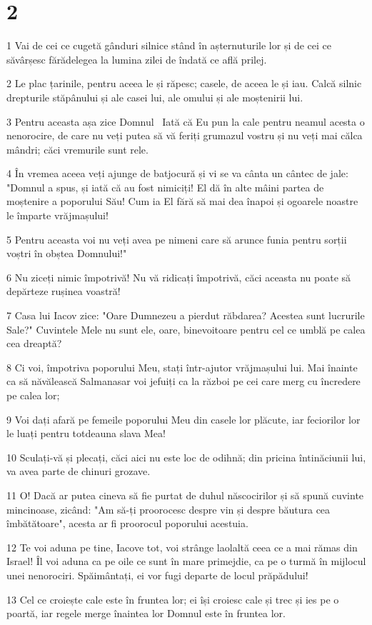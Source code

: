\chapter{2}

\par 1 Vai de cei ce cugetă gânduri silnice stând în așternuturile lor și de cei ce săvârșesc fărădelegea la lumina zilei de îndată ce află prilej.
\par 2 Le plac țarinile, pentru aceea le și răpesc; casele, de aceea le și iau. Calcă silnic drepturile stăpânului și ale casei lui, ale omului și ale moștenirii lui.
\par 3 Pentru aceasta așa zice Domnul  Iată că Eu pun la cale pentru neamul acesta o nenorocire, de care nu veți putea să vă feriți grumazul vostru și nu veți mai călca mândri; căci vremurile sunt rele.
\par 4 În vremea aceea veți ajunge de batjocură și vi se va cânta un cântec de jale: "Domnul a spus, și iată că au fost nimiciți! El dă în alte mâini partea de moștenire a poporului Său! Cum ia El fără să mai dea înapoi și ogoarele noastre le împarte vrăjmașului!
\par 5 Pentru aceasta voi nu veți avea pe nimeni care să arunce funia pentru sorții voștri în obștea Domnului!"
\par 6 Nu ziceți nimic împotrivă! Nu vă ridicați împotrivă, căci aceasta nu poate să depărteze rușinea voastră!
\par 7 Casa lui Iacov zice: "Oare Dumnezeu a pierdut răbdarea? Acestea sunt lucrurile Sale?" Cuvintele Mele nu sunt ele, oare, binevoitoare pentru cel ce umblă pe calea cea dreaptă?
\par 8 Ci voi, împotriva poporului Meu, stați într-ajutor vrăjmașului lui. Mai înainte ca să năvălească Salmanasar voi jefuiți ca la război pe cei care merg cu încredere pe calea lor;
\par 9 Voi dați afară pe femeile poporului Meu din casele lor plăcute, iar feciorilor lor le luați pentru totdeauna slava Mea!
\par 10 Sculați-vă și plecați, căci aici nu este loc de odihnă; din pricina întinăciunii lui, va avea parte de chinuri grozave.
\par 11 O! Dacă ar putea cineva să fie purtat de duhul născocirilor și să spună cuvinte mincinoase, zicând: "Am să-ți proorocesc despre vin și despre băutura cea îmbătătoare", acesta ar fi proorocul poporului acestuia.
\par 12 Te voi aduna pe tine, Iacove tot, voi strânge laolaltă ceea ce a mai rămas din Israel! Îl voi aduna ca pe oile ce sunt în mare primejdie, ca pe o turmă în mijlocul unei nenorociri. Spăimântați, ei vor fugi departe de locul prăpădului!
\par 13 Cel ce croiește cale este în fruntea lor; ei își croiesc cale și trec și ies pe o poartă, iar regele merge înaintea lor Domnul este în fruntea lor.

